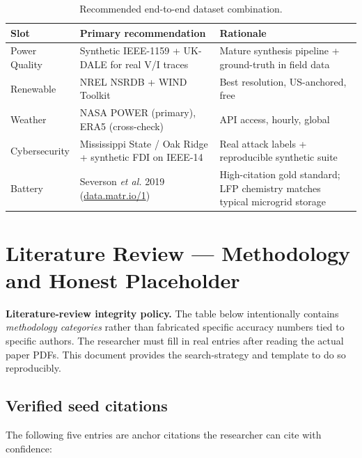\documentclass[11pt,a4paper]{article}
\begin{document}
\begin{table}[H]
\centering
\begin{tabular}{p{3.5cm}p{6cm}p{4.2cm}}
\toprule
\textbf{Slot} & \textbf{Primary recommendation} & \textbf{Rationale} \\
\midrule
Power Quality & Synthetic IEEE-1159 + UK-DALE for real V/I traces & Mature
synthesis pipeline + ground-truth in field data \\
Renewable & NREL NSRDB + WIND Toolkit & Best resolution, US-anchored, free \\
Weather & NASA POWER (primary), ERA5 (cross-check) & API access, hourly,
global \\
Cybersecurity & Mississippi State / Oak Ridge + synthetic FDI on IEEE-14 &
Real attack labels + reproducible synthetic suite \\
Battery & Severson \textit{et al.} 2019 (\href{https://data.matr.io/1/}{data.matr.io/1}) & High-citation
gold standard; LFP chemistry matches typical microgrid storage \\
\bottomrule
\end{tabular}
\caption{Recommended end-to-end dataset combination.}
\end{table}

\section{Literature Review --- Methodology and Honest Placeholder}
\label{sec:litreview}

\begin{tcolorbox}[colback=warnboxbg,colframe=warnboxbd,sharp corners,
boxrule=0.6pt,left=8pt,right=8pt,top=6pt,bottom=6pt]
\textbf{Literature-review integrity policy.} The table below intentionally
contains \emph{methodology categories} rather than fabricated specific
accuracy numbers tied to specific authors. The researcher must fill in
real entries after reading the actual paper PDFs. This document provides
the search-strategy and template to do so reproducibly.
\end{tcolorbox}

\subsection{Verified seed citations}

The following five entries are anchor citations the researcher can cite
with confidence:
\end{document}
